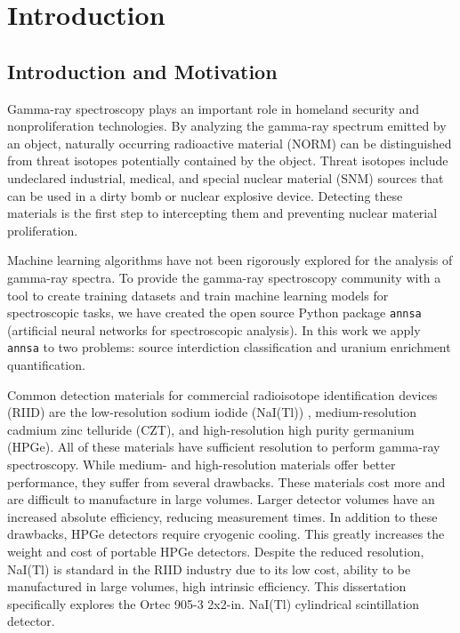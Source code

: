 \chapter{Introduction}

\section{Introduction and Motivation}

Gamma-ray spectroscopy plays an important role in homeland security and nonproliferation technologies. By analyzing the gamma-ray spectrum emitted by an object, naturally occurring radioactive material (NORM) can be distinguished from threat isotopes potentially contained by the object. Threat isotopes include undeclared industrial, medical, and special nuclear material (SNM) sources that can be used in a dirty bomb or nuclear explosive device. Detecting these materials is the first step to intercepting them and preventing nuclear material proliferation.

Machine learning algorithms have not been rigorously explored for the analysis of gamma-ray spectra. To provide the gamma-ray spectroscopy community with a tool to create training datasets and train machine learning models for spectroscopic tasks, we have created the open source Python package \verb|annsa| (artificial neural networks for spectroscopic analysis). In this work we apply \verb|annsa| to two problems: source interdiction classification and uranium enrichment quantification.

Common detection materials for commercial radioisotope identification devices (RIID) are the low-resolution sodium iodide (NaI(Tl)) \cite{Hofstadter1948}, medium-resolution cadmium zinc telluride (CZT), and high-resolution high purity germanium (HPGe). All of these materials have sufficient resolution to perform gamma-ray spectroscopy. While medium- and high-resolution materials offer better performance, they suffer from several drawbacks. These materials cost more and are difficult to manufacture in large volumes. Larger detector volumes have an increased absolute efficiency, reducing measurement times. In addition to these drawbacks, HPGe detectors require cryogenic cooling. This greatly increases the weight and cost of portable HPGe detectors. Despite the reduced resolution, NaI(Tl) is standard in the RIID industry due to its low cost, ability to be manufactured in large volumes, high intrinsic efficiency. This dissertation specifically explores the Ortec 905-3 2x2-in. NaI(Tl) cylindrical scintillation detector.

